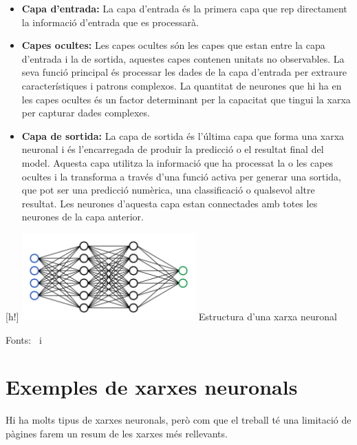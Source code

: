 \begin{itemize}
    \item \textbf{Capa d'entrada:} La capa d'entrada és la primera capa que rep directament la informació d'entrada que es processarà.
    \item \textbf{Capes ocultes:} Les capes ocultes són les capes que estan entre la capa d'entrada i la de sortida, aquestes capes contenen unitats no observables. La seva funció principal és processar les dades de la capa d'entrada per extraure característiques i patrons complexos. La quantitat de neurones que hi ha en les capes ocultes és un factor determinant per la capacitat que tingui la xarxa per capturar dades complexes.
    \item \textbf{Capa de sortida:} La capa de sortida és l'última capa que forma una xarxa neuronal i és l'encarregada de produir la predicció o el resultat final del model. Aquesta capa utilitza la informació que ha processat la o les capes ocultes i la transforma a través d'una funció activa per generar una sortida, que pot ser una predicció numèrica, una classificació o qualsevol altre resultat. Les neurones d'aquesta capa estan connectades amb totes les neurones de la capa anterior.
\end{itemize}

\begin{center}[h!]
    \centering
    \includegraphics[width=0.5\textwidth]{./figures/xarxa.png}
    \small{Estructura d'una xarxa neuronal}
\end{center}

Fonts:~\cite{Hidden_layer} i~\cite{linkedin}

\section{Exemples de xarxes neuronals}

Hi ha molts tipus de xarxes neuronals, però com que el treball té una limitació de pàgines farem un resum de les xarxes més rellevants.

